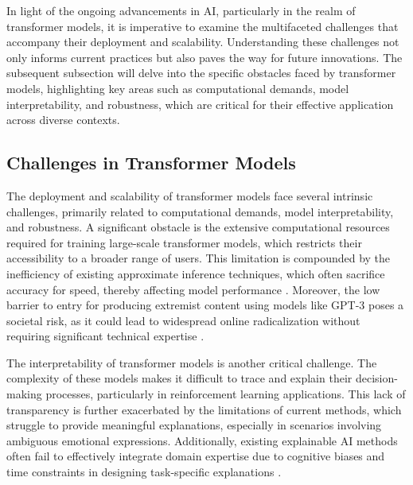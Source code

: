 In light of the ongoing advancements in AI, particularly in the realm of transformer models, it is imperative to examine the multifaceted challenges that accompany their deployment and scalability. Understanding these challenges not only informs current practices but also paves the way for future innovations. The subsequent subsection will delve into the specific obstacles faced by transformer models, highlighting key areas such as computational demands, model interpretability, and robustness, which are critical for their effective application across diverse contexts.





\subsection{Challenges in Transformer Models} \label{subsec:Challenges in Transformer Models}

The deployment and scalability of transformer models face several intrinsic challenges, primarily related to computational demands, model interpretability, and robustness. A significant obstacle is the extensive computational resources required for training large-scale transformer models, which restricts their accessibility to a broader range of users. This limitation is compounded by the inefficiency of existing approximate inference techniques, which often sacrifice accuracy for speed, thereby affecting model performance \cite{kun2022mathematicalfoundationsregressionmethods}. Moreover, the low barrier to entry for producing extremist content using models like GPT-3 poses a societal risk, as it could lead to widespread online radicalization without requiring significant technical expertise \cite{mcguffie2020radicalizationrisksgpt3advanced}.



The interpretability of transformer models is another critical challenge. The complexity of these models makes it difficult to trace and explain their decision-making processes, particularly in reinforcement learning applications. This lack of transparency is further exacerbated by the limitations of current methods, which struggle to provide meaningful explanations, especially in scenarios involving ambiguous emotional expressions. Additionally, existing explainable AI methods often fail to effectively integrate domain expertise due to cognitive biases and time constraints in designing task-specific explanations \cite{ling2021bayesiannetworkstructurelearning}.



